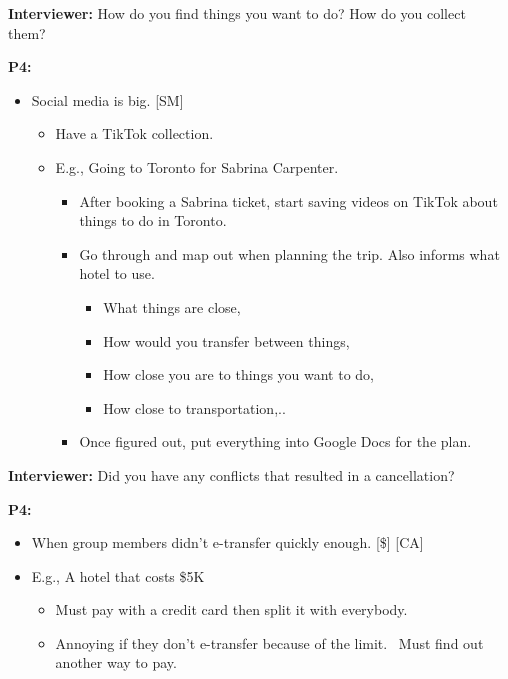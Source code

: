 \documentclass[12pt,a4paper]{article}
\begin{document}
\textbf{Interviewer:} How do you find things you want to do? How do you collect them? 

\textbf{P4:}

\begin{itemize}
    \item Social media is big. [SM]
    \begin{itemize}
        \item Have a TikTok collection. 
        \item E.g., Going to Toronto for Sabrina Carpenter. 
        \begin{itemize}
            \item After booking a Sabrina ticket, start saving videos on TikTok about things to do in Toronto. 
            \item Go through and map out when planning the trip. Also informs what hotel to use. 
            \begin{itemize}
                \item What things are close,
                \item How would you transfer between things,
                \item How close you are to things you want to do,
                \item How close to transportation,..
            \end{itemize}
            \item Once figured out, put everything into Google Docs for the plan. 
        \end{itemize}
    \end{itemize}
\end{itemize}

\textbf{Interviewer: }Did you have any conflicts that resulted in a cancellation?  

\textbf{P4:}

\begin{itemize}
    \item When group members didn’t e-transfer quickly enough. [\$] [CA]
    \item E.g., A hotel that costs \$5K
    \begin{itemize}
        \item Must pay with a credit card then split it with everybody. 
        \item Annoying if they don’t e-transfer because of the limit. 
Must find out another way to pay. 

    \end{itemize}
\end{itemize}
\end{document}

